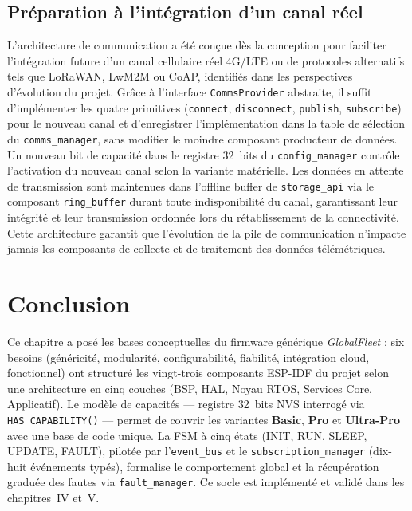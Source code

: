 \subsection{Préparation à l'intégration d'un canal réel}
\label{subsec:comms_reel}

L'architecture de communication a été conçue dès la conception pour
faciliter l'intégration future d'un canal cellulaire réel 4G/LTE
ou de protocoles alternatifs tels que LoRaWAN, LwM2M ou CoAP,
identifiés dans les perspectives d'évolution du projet. Grâce à
l'interface \texttt{CommsProvider} abstraite, il suffit d'implémenter
les quatre primitives (\texttt{connect}, \texttt{disconnect},
\texttt{publish}, \texttt{subscribe}) pour le nouveau canal et
d'enregistrer l'implémentation dans la table de sélection du
\texttt{comms\_manager}, sans modifier le moindre composant producteur
de données. Un nouveau bit de capacité dans le registre 32~bits du
\texttt{config\_manager} contrôle l'activation du nouveau canal selon
la variante matérielle. Les données en attente de transmission sont
maintenues dans l'offline buffer de \texttt{storage\_api} via le
composant \texttt{ring\_buffer} durant toute indisponibilité du canal,
garantissant leur intégrité et leur transmission ordonnée lors du
rétablissement de la connectivité. Cette architecture garantit que
l'évolution de la pile de communication n'impacte jamais les composants
de collecte et de traitement des données télémétriques.

\section{Conclusion}
\label{sec:conclu_ch3}

Ce chapitre a posé les bases conceptuelles du firmware générique
\textit{GlobalFleet} : six besoins (généricité, modularité,
configurabilité, fiabilité, intégration cloud, fonctionnel) ont
structuré les vingt-trois composants ESP-IDF du projet selon une
architecture en cinq couches (BSP, HAL, Noyau RTOS, Services Core,
Applicatif). Le modèle de capacités — registre 32~bits NVS interrogé
via \texttt{HAS\_CAPABILITY()} — permet de couvrir les variantes
\textbf{Basic}, \textbf{Pro} et \textbf{Ultra-Pro} avec une base de
code unique. La FSM à cinq états (INIT, RUN, SLEEP, UPDATE, FAULT),
pilotée par l'\texttt{event\_bus} et le \texttt{subscription\_manager}
(dix-huit événements typés), formalise le comportement global et la
récupération graduée des fautes via \texttt{fault\_manager}. Ce socle
est implémenté et validé dans les chapitres~IV et~V.